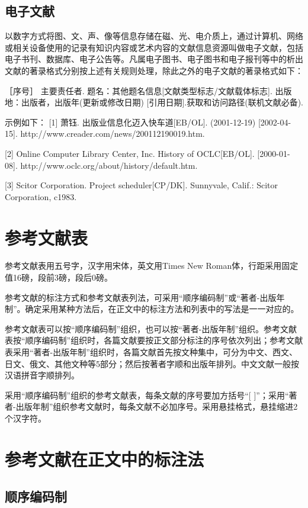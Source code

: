 \subsection{电子文献 }

以数字方式将图、文、声、像等信息存储在磁、光、电介质上，通过计算机、网络或相关设备使用的记录有知识内容或艺术内容的文献信息资源叫做电子文献，包括电子书刊、数据库、电子公告等。凡属电子图书、电子图书和电子报刊等中的析出文献的著录格式分别按上述有关规则处理，除此之外的电子文献的著录格式如下：

\kaishu［序号］ 主要责任者. 题名：其他题名信息[文献类型标志/文献载体标志]. 出版地：出版者，出版年(更新或修改日期) [引用日期].获取和访问路径(联机文献必备).

\songti
示例如下：
[1] 萧钰. 出版业信息化迈入快车道[EB/OL]. (2001-12-19) [2002-04-15]. http://www.creader.com/news/200112190019.htm.

[2] Online Computer Library Center, Inc. History of OCLC[EB/OL]. [2000-01- 08]. http://www.oclc.org/about/history/default.htm.

[3] Scitor Corporation. Project scheduler[CP/DK]. Sunnyvale, Calif.: Scitor Corporation, c1983.

\section{参考文献表}

参考文献表用五号字，汉字用宋体，英文用Times New Roman体，行距采用固定值16磅，段前3磅，段后0磅。

参考文献的标注方式和参考文献表列法，可采用“顺序编码制”或“著者-出版年制”。确定采用某种方法后，在正文中的标注方法和列表中的写法是一一对应的。

参考文献表可以按“顺序编码制”组织，也可以按“著者-出版年制”组织。参考文献表按“顺序编码制”组织时，各篇文献要按正文部分标注的序号依次列出；参考文献表采用“著者-出版年制”组织时，各篇文献首先按文种集中，可分为中文、西文、日文、俄文、其他文种等5部分；然后按著者字顺和出版年排列。中文文献一般按汉语拼音字顺排列。

采用“顺序编码制”组织的参考文献表，每条文献的序号要加方括号“[  ]”；采用“著者-出版年制”组织参考文献时，每条文献不必加序号。采用悬挂格式，悬挂缩进2个汉字符。

\section{参考文献在正文中的标注法}

\subsection{顺序编码制}

